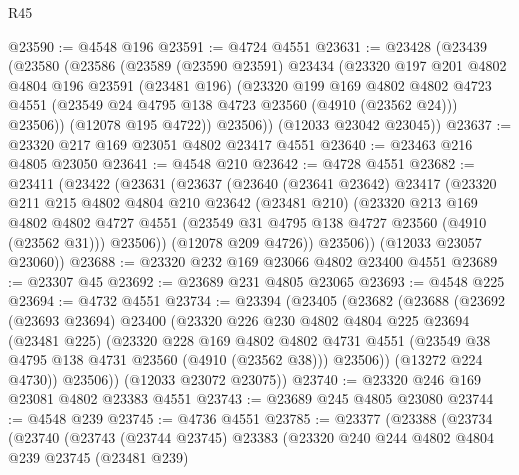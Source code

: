 \begin{lexlean}{R45}
\begin{coremodule}
@23590 := @4548 @196
@23591 := @4724 @4551
@23631 := @23428
    (@23439
      (@23580
        (@23586
          (@23589
            (@23590 @23591)
            @23434
            (@23320
              @197
              @201
              @4802
              @4804
              @196
              @23591
              (@23481 @196)
              (@23320
                @199
                @169
                @4802
                @4802
                @4723
                @4551
                (@23549 @24 @4795 @138 @4723 @23560 (@4910 (@23562 @24)))
                @23506))
            (@12078 @195 @4722))
          @23506))
      (@12033 @23042 @23045))
@23637 := @23320 @217 @169 @23051 @4802 @23417 @4551
@23640 := @23463 @216 @4805 @23050
@23641 := @4548 @210
@23642 := @4728 @4551
@23682 := @23411
    (@23422
      (@23631
        (@23637
          (@23640
            (@23641 @23642)
            @23417
            (@23320
              @211
              @215
              @4802
              @4804
              @210
              @23642
              (@23481 @210)
              (@23320
                @213
                @169
                @4802
                @4802
                @4727
                @4551
                (@23549 @31 @4795 @138 @4727 @23560 (@4910 (@23562 @31)))
                @23506))
            (@12078 @209 @4726))
          @23506))
      (@12033 @23057 @23060))
@23688 := @23320 @232 @169 @23066 @4802 @23400 @4551
@23689 := @23307 @45
@23692 := @23689 @231 @4805 @23065
@23693 := @4548 @225
@23694 := @4732 @4551
@23734 := @23394
    (@23405
      (@23682
        (@23688
          (@23692
            (@23693 @23694)
            @23400
            (@23320
              @226
              @230
              @4802
              @4804
              @225
              @23694
              (@23481 @225)
              (@23320
                @228
                @169
                @4802
                @4802
                @4731
                @4551
                (@23549 @38 @4795 @138 @4731 @23560 (@4910 (@23562 @38)))
                @23506))
            (@13272 @224 @4730))
          @23506))
      (@12033 @23072 @23075))
@23740 := @23320 @246 @169 @23081 @4802 @23383 @4551
@23743 := @23689 @245 @4805 @23080
@23744 := @4548 @239
@23745 := @4736 @4551
@23785 := @23377
    (@23388
      (@23734
        (@23740
          (@23743
            (@23744 @23745)
            @23383
            (@23320
              @240
              @244
              @4802
              @4804
              @239
              @23745
              (@23481 @239)

\end{coremodule}
\end{lexlean}

